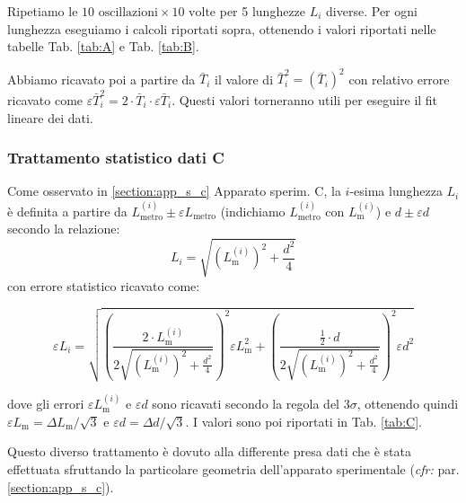 \documentclass[italian, a4paper, 10pt, twocolumn]{../../style/lab_unige}
\newcommand{\reftab}[1]{Tab. {\ref{#1}}}%
\begin{document}
  Ripetiamo le $10\text{ oscillazioni}\times10\text{ volte}$ per 5 lunghezze $L_{i}$ diverse. Per ogni 
  lunghezza eseguiamo i calcoli riportati sopra, ottenendo i valori riportati nelle tabelle \reftab{tab:A} 
  e \reftab{tab:B}.

  Abbiamo ricavato poi a partire da $\bar{T}_{i}$ il valore di $\bar{T}_{i}^{2}=(\bar{T}_{i})^{2}$ con relativo
  errore ricavato come $\varepsilon \bar{T}_{i}^{2}=2\cdot \bar{T}_{i} \cdot \varepsilon \bar{T}_{i}$. Questi valori
  torneranno utili per eseguire il fit lineare dei dati. 
  
  \subsubsection{Trattamento statistico dati C}
  \label{section:data_analysys_c}
  Come osservato in \ref{section:app_s_c} Apparato sperim. C, la $i$-esima lunghezza $L_{i}$ è definita 
  a partire da $L_{\text{metro}}^{(i)}\pm\varepsilon L_{\text{metro}}$ (indichiamo $L_{\text{metro}}^{(i)}$ 
  con $L_{\text{m}}^{(i)}$) e $d\pm\varepsilon d$ secondo la relazione:
  \[L_{i}=\sqrt{\left(L_{\text{m}}^{(i)}\right)^{2}+\frac{d^{2}}{4}}\]
  con errore statistico ricavato come:
  
  \begin{strip}
    \[\varepsilon L_{i}=
    \sqrt{\left(\frac{2\cdot L_{\text{m}}^{(i)}}{2\sqrt{\left(L_{\text{m}}^{(i)}\right)^{2}+\frac{d^{2}}{4}}}\right)^{2} \varepsilon L_{\text{m}}^{2}
                +\left(\frac{\frac{1}{2}\cdot d}{2\sqrt{\left(L_{\text{m}}^{(i)}\right)^{2}+\frac{d^{2}}{4}}}\right)^{2} \varepsilon d^{2}
    }\]
  \end{strip}

  dove gli errori $\varepsilon L_{\text{m}}^{(i)}$ e $\varepsilon d$ sono ricavati secondo la regola del $3\sigma$,
  ottenendo quindi $\varepsilon L_{\text{m}}=\Delta L_{\text{m}}/\sqrt{3}$  e $\varepsilon d=\Delta d/\sqrt{3}$.
  I valori sono poi riportati in \reftab{tab:C}.

  Questo diverso trattamento è dovuto alla differente presa dati che è stata effettuata sfruttando la particolare 
  geometria dell'apparato sperimentale (\textit{cfr:} par. \ref{section:app_s_c}).
\end{document}
